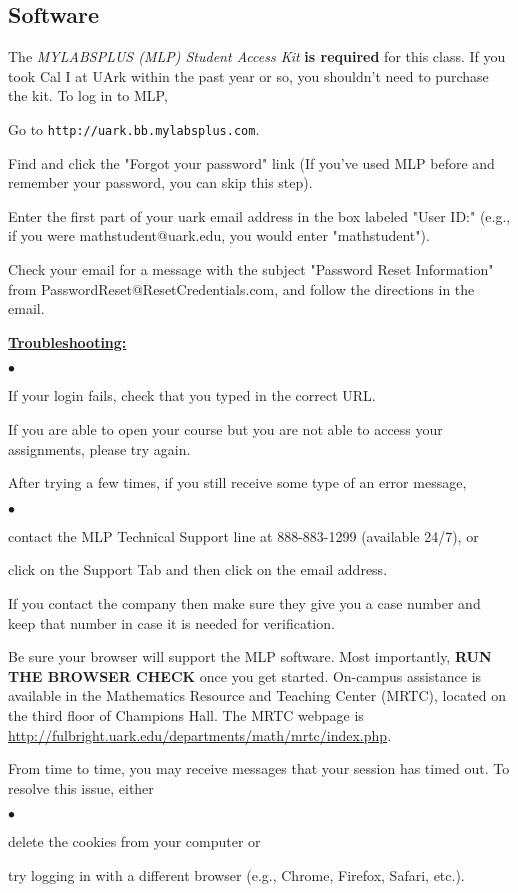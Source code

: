 \documentclass[margin,line,pifont,palatino,courier]{res}
\newenvironment{list1}{
  \begin{list}{\ding{113}}{%
      \setlength{\itemsep}{0in}
      \setlength{\parsep}{0in} \setlength{\parskip}{0in}
      \setlength{\topsep}{0in} \setlength{\partopsep}{0in}
      \setlength{\leftmargin}{0.17in}}}{\end{list}}
\newenvironment{list2}{
  \begin{list}{$\bullet$}{%
      \setlength{\itemsep}{0in}
      \setlength{\parsep}{0in} \setlength{\parskip}{0in}
      \setlength{\topsep}{0in} \setlength{\partopsep}{0in}
      \setlength{\leftmargin}{0.2in}}}{\end{list}}
\begin{document}
\begin{resume}
\section{\sc Software} The \emph{MYLABSPLUS (MLP) Student Access Kit} {\bf is required} for this class. If you took Cal I at UArk within the past year or so, you shouldn't need to purchase the kit. To log in to MLP, 
\begin{list1} 
\item Go to \verb+http://uark.bb.mylabsplus.com+. 
\item Find and click the "Forgot your password" link (If you've used MLP before and remember your password, you can skip this step).
\item Enter the first part of your uark email address in the box labeled "User ID:" (e.g., if you were mathstudent@uark.edu, you would enter "mathstudent").  
\item Check your email for a message with the subject "Password Reset Information" from PasswordReset@ResetCredentials.com, and follow the directions in the email.
\item \textbf{\underline{Troubleshooting:}} 
	\begin{list2}
	\item If your login fails, check that you typed in the correct URL. 
	\item If you are able to open your course but you are not able to access your assignments, please try again.  
	\item After trying a few times, if you still receive some type of an error message,
		\begin{list2}
		\item contact the MLP Technical Support line at 888-883-1299 (available 24/7), or 
		\item click on the Support Tab and then click on the email address. 
		\end{list2}
	If you contact the company then make sure they give you a case number and keep that number in case it is needed for verification. 
	\item Be sure your browser will support the MLP software.  Most importantly, {\bf RUN THE BROWSER CHECK} once you get started. On-campus assistance is available in the Mathematics Resource and Teaching Center (MRTC), located on the third floor of Champions Hall.  The MRTC webpage is \url{http://fulbright.uark.edu/departments/math/mrtc/index.php}. 
	\item From time to time, you may receive messages that your session has timed out. To resolve this issue, either 
		\begin{list2}
		\item delete the cookies from your computer or 
		\item try logging in with a different browser (e.g., Chrome, Firefox, Safari, etc.).
		\end{list2}
	\end{list2}	
\end{list1}


\end{resume}
\end{document}
